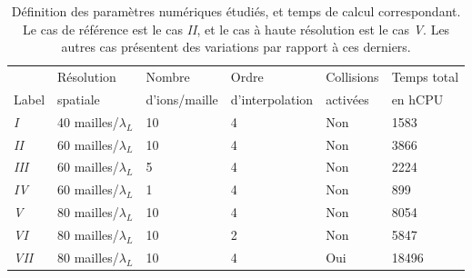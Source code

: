 \begin{refsection}
\begin{table}
\centering
\begin{tabular}{ | l | l | l | l | l || l | }
    \hline
            & Résolution    & Nombre        & Ordre             & Collisions    & Temps total \\
    Label   & spatiale      & d'ions/maille & d'interpolation   & activées      & en hCPU \\
    \hline
    \textit{I}   & 40 mailles/$\lambda_L$ & 10          & 4         & Non        & 1583     \\
    \textit{II}  & 60 mailles/$\lambda_L$ & 10          & 4         & Non        & 3866     \\
    \textit{III} & 60 mailles/$\lambda_L$ & 5           & 4         & Non        & 2224     \\
    \textit{IV}  & 60 mailles/$\lambda_L$ & 1           & 4         & Non        & 899      \\
    \textit{V}   & 80 mailles/$\lambda_L$ & 10          & 4         & Non        & 8054     \\
    \textit{VI}  & 80 mailles/$\lambda_L$ & 10          & 2         & Non        & 5847     \\
    \textit{VII} & 80 mailles/$\lambda_L$ & 10          & 4         & Oui        & 18496    \\
    \hline
    \end{tabular}
    \caption{Définition des paramètres numériques étudiés, et temps de calcul correspondant. Le cas de référence est le cas \textit{II}, et le cas à haute résolution est le cas \textit{V}. Les autres cas présentent des variations par rapport à ces derniers.}
	\label{tab:4-temps_calcul_PIC}
\end{table}



\end{refsection}
